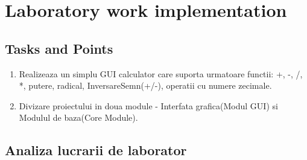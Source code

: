 \section{Laboratory work implementation}

\subsection{Tasks and Points}

\begin{enumerate}
\item Realizeaza un simplu GUI calculator care suporta urmatoare functii: +, -, /, *, putere, radical, InversareSemn(+/-), operatii cu numere zecimale.
\item Divizare proiectului in doua module - Interfata grafica(Modul GUI) si Modulul de baza(Core Module).
\end{enumerate}

\subsection{Analiza lucrarii de laborator}

